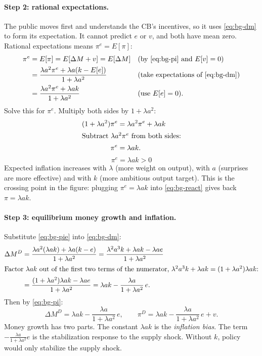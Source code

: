 \paragraph{Step 2: rational expectations.} The public moves first and understands the CB's incentives, so it uses \eqref{eq:bg-dm} to form its expectation. It cannot predict $e$ or $v$, and both have mean zero. Rational expectations means $\pi^e=E[\pi]$:
\begin{align*}
\pi^e&=E[\pi]=E[\Delta M+v]=E[\Delta M] &&\text{(by \eqref{eq:bg-pi} and $E[v]=0$)}\\
&=\frac{\lambda a^2\pi^e+\lambda a(k-E[e])}{1+\lambda a^2} &&\text{(take expectations of \eqref{eq:bg-dm})}\\
&=\frac{\lambda a^2\pi^e+\lambda ak}{1+\lambda a^2} &&\text{(use $E[e]=0$).}
\end{align*}
Solve this for $\pi^e$. Multiply both sides by $1+\lambda a^2$:
\begin{align*}
(1+\lambda a^2)\pi^e&=\lambda a^2\pi^e+\lambda ak\\
\intertext{Subtract $\lambda a^2\pi^e$ from both sides:}
\pi^e&=\lambda ak .
\end{align*}
\begin{equation}
\boxed{\pi^e=\lambda ak>0}\label{eq:bg-pie}
\end{equation}
Expected inflation increases with $\lambda$ (more weight on output), with $a$ (surprises are more effective) and with $k$ (more ambitious output target). This is the crossing point in the figure: plugging $\pi^e=\lambda ak$ into \eqref{eq:bg-react} gives back $\pi=\lambda ak$.

\paragraph{Step 3: equilibrium money growth and inflation.} Substitute \eqref{eq:bg-pie} into \eqref{eq:bg-dm}:
\begin{align*}
\Delta M^D&=\frac{\lambda a^2(\lambda ak)+\lambda a(k-e)}{1+\lambda a^2}
=\frac{\lambda^2a^3k+\lambda ak-\lambda ae}{1+\lambda a^2}\\
\intertext{Factor $\lambda ak$ out of the first two terms of the numerator, $\lambda^2a^3k+\lambda ak=(1+\lambda a^2)\lambda ak$:}
&=\frac{(1+\lambda a^2)\lambda ak-\lambda ae}{1+\lambda a^2}
=\lambda ak-\frac{\lambda a}{1+\lambda a^2}\,e .
\end{align*}
Then by \eqref{eq:bg-pi}:
\begin{equation}
\Delta M^D=\lambda ak-\frac{\lambda a}{1+\lambda a^2}\,e,\qquad
\pi^D=\lambda ak-\frac{\lambda a}{1+\lambda a^2}\,e+v .\label{eq:bg-piD}
\end{equation}
Money growth has two parts. The constant $\lambda ak$ is the \emph{inflation bias}. The term $-\frac{\lambda a}{1+\lambda a^2}e$ is the stabilization response to the supply shock. Without $k$, policy would only stabilize the supply shock.

